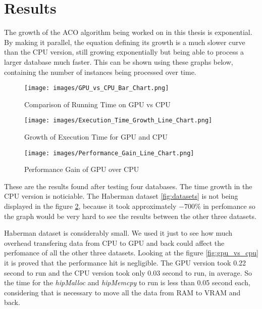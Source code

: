 \section{Results} \label{Results}

The growth of the ACO algorithm being worked on in this thesis is exponential.
By making it parallel, the equation defining its growth is a much slower curve than the CPU version,
still growing exponentially but being able to process a larger database much faster.
This can be shown using these graphs below, containing the number of instances being processed over time.

\begin{figure}[ht]
    \centering
    \begin{minipage}{0.48\textwidth}
        \centering
        \texttt{[image: images/GPU\_vs\_CPU\_Bar\_Chart.png]}
        \caption{Comparison of Running Time on GPU vs CPU}
        \label{fig:gpu_vs_cpu}
    \end{minipage}\hfill
    \begin{minipage}{0.48\textwidth}
        \centering
        \texttt{[image: images/Execution\_Time\_Growth\_Line\_Chart.png]}
        \caption{Growth of Execution Time for GPU and CPU}
        \label{fig:execution_time_growth}
    \end{minipage}
\end{figure}


\begin{figure}[ht]
    \centering
    \texttt{[image: images/Performance\_Gain\_Line\_Chart.png]}
    \caption{Performance Gain of GPU over CPU}
    \label{fig:performance_gain}
\end{figure}

These are the results found after testing four databases. The time growth in the CPU version is noticiable.
The Haberman dataset \ref{fig:datasets} is not being displayed in the figure \ref{fig:performance_gain}, because it took approximately $-700\%$
in perfomance so the graph would be very hard to see the results between the other three datasets.

Haberman dataset is considerably small. We used it just to see how much overhead transfering data from CPU to GPU and back
could affect the perfomance of all the other three datasets. Looking at the figure \ref{fig:gpu_vs_cpu} it is proved that
the performance hit is negligible. The GPU version took 0.22 second to run and the CPU version took only
0.03 second to run, in average. So the time for the \emph{hipMalloc} and \emph{hipMemcpy} to run is less than 0.05 second each,
considering that is necessary to move all the data from RAM to VRAM and back.
